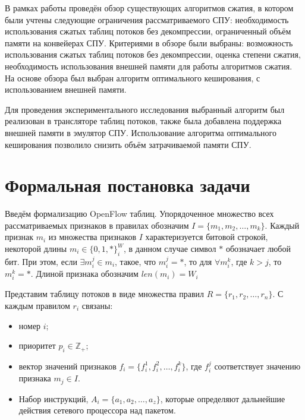 \documentclass[a4peper, 12pt, titlepage, finall]{extreport}
\begin{document}
        В рамках работы проведён обзор существующих алгоритмов сжатия, в котором были учтены следующие ограничения рассматриваемого СПУ:
        необходимость использования сжатых таблиц потоков без декомпрессии, ограниченный объём памяти на конвейерах СПУ. Критериями в обзоре
        были выбраны: возможность использования сжатых таблиц потоков без декомпрессии, оценка степени сжатия, необходимость использования внешней памяти
        для работы алгоритмов сжатия. На основе обзора был выбран алгоритм оптимального кеширования, с использованием внешней памяти.
        
        Для проведения экспериментального исследования выбранный алгоритм был реализован в трансляторе таблиц потоков, также была добавлена поддержка внешней памяти в 
        эмулятор СПУ. Использование алгоритма оптимального кеширования позволило снизить объём затрачиваемой памяти СПУ.\\
        \newpage
    \section{Формальная постановка задачи}
        Введём формализацию OpenFlow таблиц.
        Упорядоченное множество всех рассматриваемых признаков в правилах обозначим \(I=\{m_1,m_2,\ldots,m_k\}\). 
        Каждый признак \(m_i\) из множества признаков \(I\) характеризуется битовой строкой, некоторой длины \(m_i \in \{0, 1, *\}^W_i\),
        в данном случае символ \(*\) обозначает любой бит. При этом, если \(\exists m_i^j \in m_i\), такое, что 
        \( m_i^j = *\), то для \( \forall m_i^k \), где \(k > j\), то \( m_i^k = *\). Длиной признака обозначим \(len(m_i) = W_i\)

        Представим таблицу потоков в виде множества правил \(R=\{r_1,r_2,\ldots,r_n\}\). С каждым правилом \(r_i\) связаны:
        \begin{itemize}
            \item номер \(i\);
            \item приоритет \(p_i\in \mathbb{Z_+}\);
            \item вектор значений признаков \(f_i=\{f_i^1,f_i^2,\ldots,f_i^k\}\), где \(f_i^j\) соответствует значению признака \(m_j\in I\). %
            \item Набор инструкций, \(A_i = \{a_1, a_2, \ldots, a_z\} \), которые определяют дальнейшие действия сетевого процессора над пакетом.
        \end{itemize}
\end{document}
